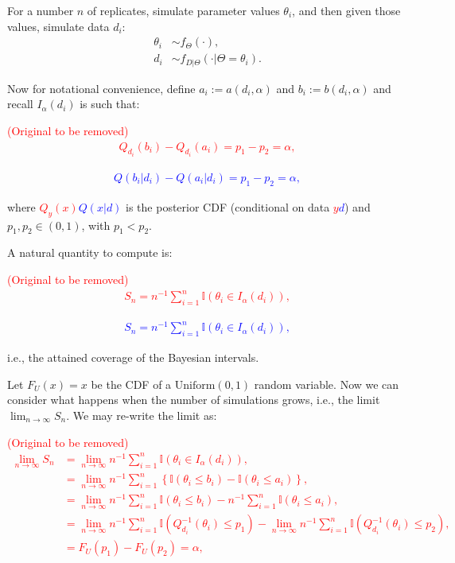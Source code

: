 \documentclass[oneside]{article}
\begin{document}
For a number $n$ of replicates, simulate parameter values $\theta_i$, and then given those values, simulate data $d_i$:
\begin{align*}
\theta_i & \sim f_\Theta(\cdot), \\
d_i & \sim f_{D|\Theta}(\cdot | \Theta=\theta_i).
\end{align*}

Now for notational convenience, define $a_i := a(d_i, \alpha)$ and $b_i := b(d_i, \alpha)$ and recall $I_{\alpha}\left(d_i\right)$ is such that:


\textcolor{red}{
  (Original to be removed)
\begin{align*}
Q_{d_i}\left(b_i\right) - Q_{d_i}\left(a_i\right) = p_1 - p_2 = \alpha,
\end{align*}
}

\textcolor{blue}{
\begin{align*}
Q\left(b_i | d_i\right) - Q\left(a_i | d_i\right) = p_1 - p_2 = \alpha,
\end{align*}
}

\noindent where
\textcolor{red}{\st{$Q_{y}(x)$}}\textcolor{blue}{$Q(x|d)$} is the posterior CDF (conditional on data \textcolor{red}{\st{$y$}}\textcolor{blue}{$d$}) and $p_1, p_2 \in (0,1)$, with $p_1 < p_2$.

A natural quantity to compute is:

\textcolor{red}{
  (Original to be removed)
\begin{align*}
S_n = n^{-1}\sum_{i=1}^n \mathbb{I}\left(\theta_i \in I_{\alpha}\left(d_i\right) \right),
\end{align*}
}

\textcolor{blue}{
\begin{align*}
S_n = n^{-1}\sum_{i=1}^n \mathbb{I}\left(\theta_i \in I_{\alpha}\left(d_i\right) \right),
\end{align*}
}

\noindent i.e., the attained coverage of the Bayesian intervals.

Let $F_U(x) = x$ be the CDF of a $\operatorname{Uniform(0, 1)}$ random variable. 
Now we can consider what happens when the number of simulations grows, i.e., the limit $\lim_{n \to \infty} S_n$.
We may re-write the limit as:

\textcolor{red}{
  (Original to be removed)
\begin{align*}
\lim_{n \to \infty} S_n &= \lim_{n \to \infty} n^{-1}\sum_{i=1}^n \mathbb{I}\left(\theta_i \in I_{\alpha}\left(d_i\right) \right),\\
&=  \lim_{n \to \infty} n^{-1}\sum_{i=1}^n \left\{ \mathbb{I}\left(\theta_i \leq b_i \right) - \mathbb{I}\left(\theta_i \leq a_i \right) \right\},\\
&=  \lim_{n \to \infty} n^{-1}\sum_{i=1}^n \mathbb{I}\left(\theta_i \leq b_i \right) -  n^{-1}\sum_{i=1}^n\mathbb{I}\left(\theta_i \leq a_i \right),\\
&=  \lim_{n \to \infty} n^{-1}\sum_{i=1}^n \mathbb{I}\left(Q_{d_i}^{-1}\left(\theta_i\right) \leq p_1 \right) -   \lim_{n \to \infty} n^{-1}\sum_{i=1}^n\mathbb{I}\left(Q_{d_i}^{-1}\left(\theta_i\right) \leq p_2 \right),\\
&= F_U(p_1) - F_U(p_2) = \alpha,
\end{align*}
}
\end{document}
